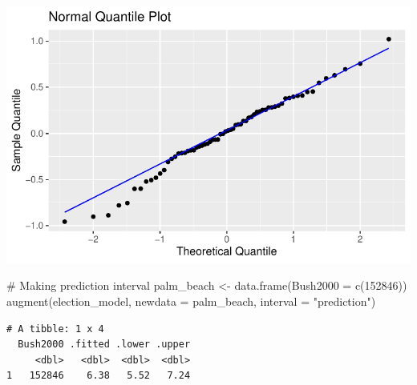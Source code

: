\documentclass[
  letterpaper,
  DIV=11,
  numbers=noendperiod]{scrartcl}
\newenvironment{Shaded}{\begin{snugshade}}{\end{snugshade}}
\newcommand{\AttributeTok}[1]{\textcolor[rgb]{0.40,0.45,0.13}{#1}}
\newcommand{\CommentTok}[1]{\textcolor[rgb]{0.37,0.37,0.37}{#1}}
\newcommand{\DecValTok}[1]{\textcolor[rgb]{0.68,0.00,0.00}{#1}}
\newcommand{\FunctionTok}[1]{\textcolor[rgb]{0.28,0.35,0.67}{#1}}
\newcommand{\NormalTok}[1]{\textcolor[rgb]{0.00,0.23,0.31}{#1}}
\newcommand{\OtherTok}[1]{\textcolor[rgb]{0.00,0.23,0.31}{#1}}
\newcommand{\StringTok}[1]{\textcolor[rgb]{0.13,0.47,0.30}{#1}}
\begin{document}
\includegraphics{case-study-template_files/figure-pdf/unnamed-chunk-6-11.pdf}

\begin{Shaded}
\begin{Highlighting}[]
\CommentTok{\# Making prediction interval}
\NormalTok{palm\_beach }\OtherTok{\textless{}{-}} \FunctionTok{data.frame}\NormalTok{(}\AttributeTok{Bush2000 =} \FunctionTok{c}\NormalTok{(}\DecValTok{152846}\NormalTok{))}
\FunctionTok{augment}\NormalTok{(election\_model, }\AttributeTok{newdata =}\NormalTok{ palm\_beach, }\AttributeTok{interval =} \StringTok{"prediction"}\NormalTok{)}
\end{Highlighting}
\end{Shaded}

\begin{verbatim}
# A tibble: 1 x 4
  Bush2000 .fitted .lower .upper
     <dbl>   <dbl>  <dbl>  <dbl>
1   152846    6.38   5.52   7.24
\end{verbatim}
\end{document}
